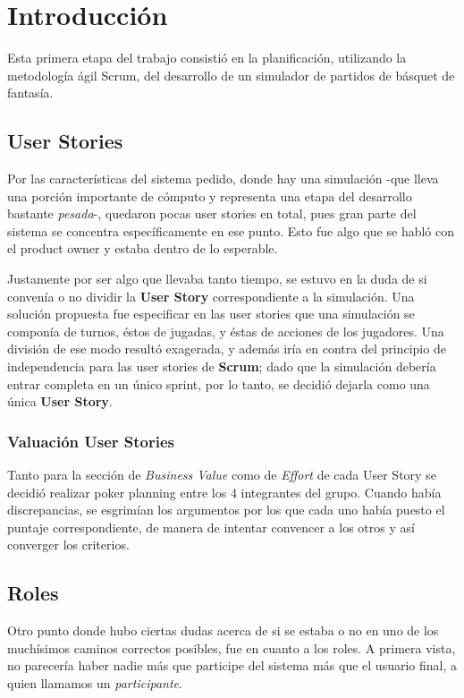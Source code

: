 \section{Introducción}
\indent \indent Esta primera etapa del trabajo consistió en la planificación, utilizando la metodología ágil Scrum, del desarrollo de un simulador de partidos de básquet de fantasía.

\subsection*{User Stories}
Por las características del sistema pedido, donde hay una simulación -que lleva una porción importante de cómputo y representa una etapa del desarrollo bastante \emph{pesada}-, quedaron pocas user stories en total, pues gran parte del sistema se concentra específicamente en ese punto. Esto fue algo que se habló con el product owner y estaba dentro de lo esperable.

Justamente por ser algo que llevaba tanto tiempo, se estuvo en la duda de si convenía o no dividir la \textbf{User Story} correspondiente a la simulación. Una solución propuesta fue especificar en las user stories que una simulación se componía de turnos, éstos de jugadas, y éstas de acciones de los jugadores. Una división de ese modo resultó exagerada, y además iría en contra del principio de independencia para las user stories de \textbf{Scrum}; dado que la simulación debería entrar completa en un único sprint, por lo tanto, se decidió dejarla como una única \textbf{User Story}.


\subsubsection*{Valuación User Stories}
Tanto para la sección de \emph{Business Value} como de \emph{Effort} de cada User Story se decidió realizar poker planning entre los 4 integrantes del grupo. Cuando había discrepancias, se esgrimían los argumentos por los que cada uno había puesto el puntaje correspondiente, de manera de intentar convencer a los otros y así converger los criterios.

\subsection*{Roles}
Otro punto donde hubo ciertas dudas acerca de si se estaba o no en uno de los muchísimos caminos correctos posibles, fue en cuanto a los roles. A primera vista, no parecería haber nadie más que participe del sistema más que el usuario final, a quien llamamos un \emph{participante}. 


